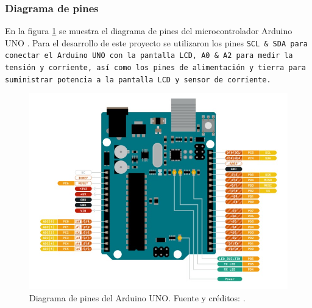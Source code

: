\subsubsection{Diagrama de pines}
En la figura \ref{Fig: Diagrama_pines} se muestra el diagrama de pines del microcontrolador Arduino UNO \cite{datasheet}. Para el desarrollo de este proyecto se utilizaron los pines \tt{SCL} \& \tt{SDA} para conectar el Arduino UNO con la pantalla LCD, \tt{A0} \& \tt{A2} para medir la tensión y corriente, así como los pines de alimentación y tierra para suministrar potencia a la pantalla LCD y sensor de corriente.

\begin{figure}[H]
\centering
\includegraphics[width=\textwidth]{Imagenes/Diagrama_Pines.jpg} 
\caption{Diagrama de pines del Arduino UNO. Fuente y créditos: \cite{datasheet}.}
\label{Fig: Diagrama_pines}
\end{figure}